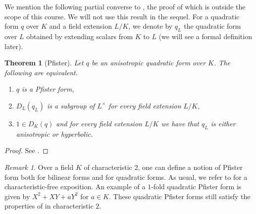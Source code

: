 \documentclass[12pt, leqno, british]{amsart}
\theoremstyle{definition}
\theoremstyle{plain}
\newtheorem{thm}[defi]{Theorem}
\theoremstyle{remark}
\newtheorem{rem}[defi]{Remark}
\begin{document}
We mention the following partial converse to , the proof of which is outside the scope of this course.
We will not use this result in the sequel.
For a quadratic form $q$ over $K$ and a field extension $L/K$, we denote by $q_L$ the quadratic form over $L$ obtained by extending scalars from $K$ to $L$ (we will see a formal definition later).
\begin{thm}[Pfister]
Let $q$ be an anisotropic quadratic form over $K$.
The following are equivalent.
\begin{enumerate}
\item $q$ is a Pfister form,
\item $D_L(q_L)$ is a subgroup of $L^\times$ for every field extension $L/K$,
\item $1 \in D_K(q)$ and for every field extension $L/K$ we have that $q_L$ is either anisotropic or hyperbolic.
\end{enumerate}
\end{thm}
\begin{proof}
See \autocite[Theorem 23.2 and Corollary 23.4]{ElmanKarpenkoMerkurjev}.
\end{proof}
\begin{rem}
Over a field $K$ of characteristic $2$, one can define a notion of Pfister form both for bilinear forms and for quadratic forms.
As usual, we refer to \autocite[Sections 7 and 9]{ElmanKarpenkoMerkurjev} for a characteristic-free exposition.
An example of a $1$-fold quadratic Pfister form is given by $X^2 + XY + aY^2$ for $a \in K$.
These quadratic Pfister forms still satisfy the properties of  in characteristic $2$.
\end{rem}
\end{document}
